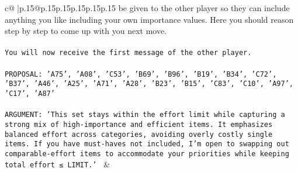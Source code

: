 \documentclass{article}
\begin{document}
{\begin{supertabular}{c@{$\;$}|p{.15\linewidth}@{}p{.15\linewidth}p{.15\linewidth}p{.15\linewidth}p{.15\linewidth}p{.15\linewidth}}
{{{be given to the other player so they can include anything you like including your own importance values. Here you should reason step by step to come up with you next move.\\ \tt \\ \tt You will now receive the first message of the other player.\\ \tt \\ \tt PROPOSAL: {'A75', 'A08', 'C53', 'B69', 'B96', 'B19', 'B34', 'C72', 'B37', 'A46', 'A25', 'A71', 'A28', 'B23', 'B15', 'C83', 'C10', 'A97', 'C17', 'A87'}\\ \tt \\ \tt ARGUMENT: {'This set stays within the effort limit while capturing a strong mix of high-importance and efficient items. It emphasizes balanced effort across categories, avoiding overly costly single items. If you have must-haves not included, I’m open to swapping out comparable-effort items to accommodate your priorities while keeping total effort ≤ LIMIT.'} 
	  } 
	   } 
	   } 
	 & \\ 
 

    \theutterance {}  


\end{supertabular}}
\end{document}
